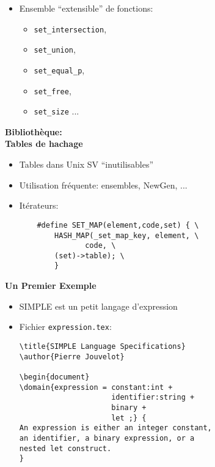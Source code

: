 \documentclass[11pt]{article}
\newcommand{\newgen}{NewGen}
\begin{document}
{\begin{itemize}
\begin{verbatim}
    printf( "Users logged on: " ) ;
    SET_MAP( u, {
        printf( "%s ", user_name( u )) ;
    }, logged_on ) ;
\end{verbatim}  
\item Ensemble ``extensible{}'' de fonctions:
  \begin{itemize}
  \item {\tt set\_intersection}, 
  \item {\tt set\_union},
  \item {\tt set\_equal\_p}, 
  \item {\tt set\_free}, 
  \item {\tt set\_size} ...
  \end{itemize}
\end{itemize}

\newpage

\begin{center}
{\huge\bf Bibliothèque: \\
Tables de hachage}
\end{center}

\vskip 2cm

\begin{itemize}
\item Tables dans Unix SV ``inutilisables''
\item Utilisation fréquente: ensembles, \newgen, ...
\item Itérateurs:

\begin{verbatim}
    #define SET_MAP(element,code,set) { \
        HASH_MAP(_set_map_key, element, \
               code, \
        (set)->table); \
        }
\end{verbatim}
\end{itemize}

\newpage

\begin{center}
{\huge\bf Un Premier Exemple}
\end{center}

\vskip 2cm

\begin{itemize}
\item SIMPLE est un petit langage d'expression
\item Fichier {\tt expression.tex}:

\begin{verbatim}
\title{SIMPLE Language Specifications}
\author{Pierre Jouvelot}

\begin{document}
\domain{expression = constant:int +
                     identifier:string + 
                     binary + 
                     let ;} {
An expression is either an integer constant, 
an identifier, a binary expression, or a 
nested let construct.
}


\end{verbatim}
\end{itemize}}
\end{document}
